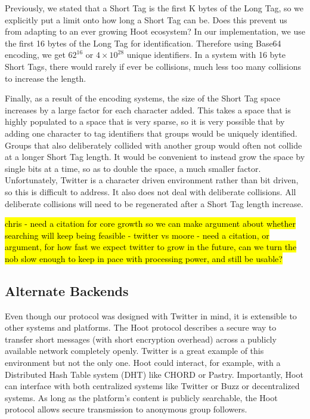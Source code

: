 Previously, we stated that a Short Tag is the first K bytes of the Long Tag, so we explicitly put a limit onto how long a Short Tag can be. Does this prevent us from adapting to an ever growing Hoot ecosystem? In our implementation, we use the first 16 bytes of the Long Tag for identification. Therefore using Base64 encoding, we get $62^{16}$ or $4\times10^{28}$ unique identifiers. In a system with 16 byte Short Tags, there would rarely if ever be collisions, much less too many collisions to increase the length.

Finally, as a result of the encoding systems, the size of the Short Tag space increases by a large factor for each character added. This takes a space that is highly populated to a space that is very sparse, so it is very possible that by adding one character to tag identifiers that groups would be uniquely identified. Groups that also deliberately collided with another group would often not collide at a longer Short Tag length. It would be convenient to instead grow the space by single bits at a time, so as to double the space, a much smaller factor. Unfortunately, Twitter is a character driven environment rather than bit driven, so this is difficult to address. It also does not deal with deliberate collisions. All deliberate collisions will need to be regenerated after a Short Tag length increase.


\hl{
chris 
- need a citation for core growth so we can make argument about whether searching will keep being feasible
- twitter vs moore
- need a citation, or argument, for how fast we expect twitter to grow in the future, can we turn the nob slow enough to keep in pace with processing power, and still be usable? 
}

\subsection{Alternate Backends}

Even though our protocol was designed with Twitter in mind, it is extensible to other systems and platforms. The Hoot protocol describes a secure way to transfer short messages (with short encryption overhead) across a publicly available network completely openly. Twitter is a great example of this environment but not the only one. Hoot could interact, for example, with a Distributed Hash Table system (DHT) like CHORD or Pastry. Importantly, Hoot can interface with both centralized systems like Twitter or Buzz or decentralized systems. As long as the platform's content is publicly searchable, the Hoot protocol allows secure transmission to anonymous group followers.
